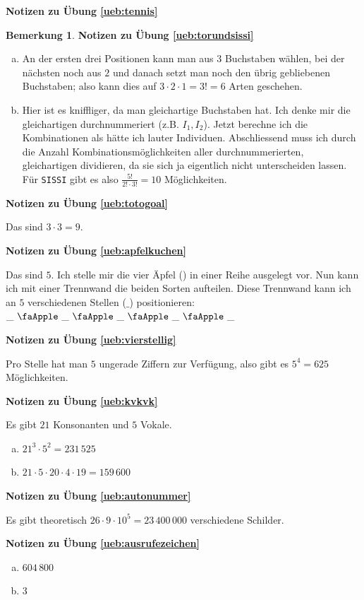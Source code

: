 \documentclass[%
<<<<<<< Updated upstream
11pt,%
twoside,%
titlepage,%
german,%
=======
11pt,%
twoside,%
titlepage,%
swissgerman,%
>>>>>>> Stashed changes
headsepline%
]{scrartcl}
\newcommand{\faReturnGray}{\textcolor{gray}{\faMailReply}} %
\theoremstyle{definition}
\newtheorem{bem}{Bemerkung}[subsection] %
\theoremstyle{plain}
\newcommand{\concatueb}[1]{ueb:#1}%
\newcommand{\concatlsg}[1]{lsg:#1}%
\newenvironment{lsg}[1]{%
    \par\noindent\textbf{Notizen zu Übung \ref{\concatueb{#1}}}\label{\concatlsg{#1}}
    \hfill\hyperref[\concatueb{#1}]{\faReturnGray}\par %
}{%
    \par%
}
\newcounter{theo}[section]\setcounter{theo}{0}
\newcommand{\concatueb}[1]{ueb:#1}%
\newcommand{\concatlsg}[1]{lsg:#1}%
\newenvironment{lsg}[1]{%
    \par\noindent\textbf{Notizen zu Übung \ref{\concatueb{#1}}.}%
    \label{\concatlsg{#1}}
}{%
    \par%
}
\begin{document}
\begin{lsg}{tennis}
\begin{bem}
\begin{lsg}{torundsissi}
\begin{enumerate}[a)]
\item An der ersten drei Positionen kann man aus $3$ Buchstaben w\"ahlen, bei der n\"achsten noch aus $2$ und danach setzt man noch den \"ubrig gebliebenen Buchstaben; also kann dies auf $3\cdot2\cdot1=3!=6$ Arten geschehen.
\item Hier ist es kniffliger, da man gleichartige Buchstaben hat. Ich denke mir die gleichartigen durchnummeriert (z.B. $I_{1}, I_{2}$). Jetzt berechne ich die Kombinationen als h\"atte ich lauter Individuen. Abschliessend muss ich durch die Anzahl Kombinationsm\"oglichkeiten aller durchnummerierten, gleichartigen dividieren, da sie sich ja eigentlich nicht unterscheiden lassen. F\"ur \texttt{SISSI} gibt es also $\frac{5!}{2!\cdot3!}=10$ M\"oglichkeiten.
\end{enumerate}
\end{lsg}
\begin{lsg}{totogoal}
Das sind $3\cdot3=9$.
\end{lsg}
\begin{lsg}{apfelkuchen}
Das sind $5$. Ich stelle mir die vier \"Apfel (\faApple) in einer Reihe ausgelegt vor. Nun kann ich mit einer Trennwand die beiden Sorten aufteilen. Diese Trennwand kann ich an $5$ verschiedenen Stellen ($\_$) positionieren:
$\_\ \text{\faApple}\ \_\ \text{\faApple}\ \_\ \text{\faApple}\ \_\ \text{\faApple}\ \_$
\end{lsg}
\begin{lsg}{vierstellig}
Pro Stelle hat man $5$ ungerade Ziffern zur Verf\"ugung, also gibt es $5^{4}=625$ M\"oglichkeiten.
\end{lsg}
\begin{lsg}{kvkvk}
Es gibt $21$ Konsonanten und $5$ Vokale.
\begin{enumerate}[a)]
\item $21^{3}\cdot5^{2}=231\,525$
\item $21\cdot5\cdot20\cdot4\cdot19=159\,600$
\end{enumerate}
\end{lsg}
\begin{lsg}{autonummer}
Es gibt theoretisch $26\cdot9\cdot10^{5}=23\,400\,000$ verschiedene Schilder.
\end{lsg}
\begin{lsg}{ausrufezeichen}
\begin{enumerate}[a)]
\item $604\,800$
\item $3$

\end{enumerate}
\end{lsg}
\end{bem}
\end{lsg}
\end{document}
